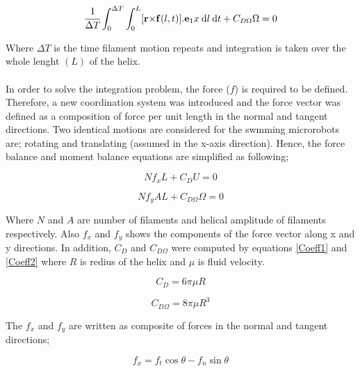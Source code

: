 \documentclass[12pt,a4paper,titlepage]{report}
\begin{document}
\begin{equation}
  \cfrac {1} {\Delta T}  \int_0^{\Delta T} \int_0^L [\bold r \bold \times \bold f(l,t)] . \bold e_1x \: \mathrm{d}l \:\mathrm{d}t + C_{D\Omega}\Omega= 0
\label{torque_1}
\end{equation}

Where $\Delta T$ is the time filament motion repeats and integration is taken over the whole lenght $(L)$ of the
helix. 

\paragraph{}
In order to solve the integration problem, the force ($f$) is required to be defined. Therefore, a new
coordination system was introduced and the force vector was defined as a composition of force per unit length
in the normal and tangent directions. Two identical motions are considered for the swmming microrobots
are; rotating and translating (assumed in the x-axis direction). Hence, the force balance and moment balance 
equations are simplified as following; 


\begin{equation}
Nf_xL  + C_DU  = 0
\label{simple_thrust}
\end{equation}



\begin{equation}
 Nf_yAL + C_{D\Omega}\Omega= 0
\label{simple_torque}
\end{equation}

Where $N$ and $A$ are number of filaments and helical amplitude of filaments respectively. Also $f_x$ and 
$f_y$ shows the components of the force vector along x and y directions. In addition, $C_D$ and $C_{D\Omega}$
were computed by equations \ref{Coeff1} and \ref{Coeff2} where $R$ is redius of the helix and $\mu$ is fluid velocity.


\begin{equation}
 C_D  = 6 \pi \mu R
\label{Coeff1}
\end{equation}



\begin{equation}
 C_{D\Omega}= 8 \pi \mu R^3
\label{Coeff2}
\end{equation}

The $f_x$ and $f_y$ are written as composite of forces in the normal and tangent directions;

\begin{equation}
 f_x  = f_t\cos \theta - f_n\sin \theta
\label{normal}
\end{equation}
\end{document}
